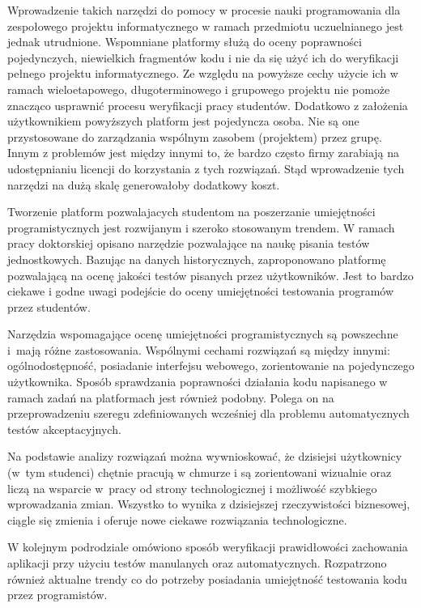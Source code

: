 Wprowadzenie takich narzędzi do pomocy w procesie nauki programowania dla zespołowego projektu informatycznego w ramach przedmiotu uczuelnianego jest jednak utrudnione.
Wspomniane platformy służą do oceny poprawności pojedynczych, niewielkich fragmentów kodu i nie da się użyć ich do weryfikacji pełnego projektu informatycznego.
Ze względu na powyższe cechy użycie ich w ramach wieloetapowego, długoterminowego i grupowego projektu nie pomoże znacząco usprawnić procesu weryfikacji pracy studentów.
Dodatkowo z założenia użytkownikiem powyższych platform jest pojedyncza osoba.
Nie są one przystosowane do zarządzania wspólnym zasobem (projektem) przez grupę.
Innym z problemów jest między innymi to, że bardzo często firmy zarabiają na udostępnianiu licencji do korzystania z tych rozwiązań.
Stąd wprowadzenie tych narzędzi na dużą skalę generowałoby dodatkowy koszt.

Tworzenie platform pozwalajacych studentom na poszerzanie umiejętności programistycznych jest rozwijanym i szeroko stosowanym trendem.
W ramach pracy doktorskiej \cite{teach-testing-thesis} opisano narzędzie pozwalające na naukę pisania testów jednostkowych.
Bazując na danych historycznych, zaproponowano platformę pozwalającą na ocenę jakości testów pisanych przez użytkowników.
Jest to bardzo ciekawe i godne uwagi podejście do oceny umiejętności testowania programów przez studentów.

Narzędzia wspomagające ocenę umiejętności programistycznych są powszechne i~mają różne zastosowania.
Wspólnymi cechami rozwiązań są między innymi: ogólnodostępność, posiadanie interfejsu webowego, zorientowanie na pojedynczego użytkownika.
Sposób sprawdzania poprawności działania kodu napisanego w ramach zadań na platformach jest również podobny.
Polega on na przeprowadzeniu szeregu zdefiniowanych wcześniej dla problemu automatycznych testów akceptacyjnych.

Na podstawie analizy rozwiązań można wywnioskować, że dzisiejsi użytkownicy (w~tym studenci) chętnie pracują w chmurze i są zorientowani wizualnie oraz liczą na wsparcie w~pracy od strony technologicznej i możliwość szybkiego wprowadzania zmian.
Wszystko to wynika z dzisiejszej rzeczywistości biznesowej, ciągle się zmienia i oferuje nowe ciekawe rozwiązania technologiczne.

W kolejnym podrodziale omówiono sposób weryfikacji prawidłowości zachowania aplikacji przy użyciu testów manulanych oraz automatycznych.
Rozpatrzono również aktualne trendy co do potrzeby posiadania umiejętność testowania kodu przez programistów.

